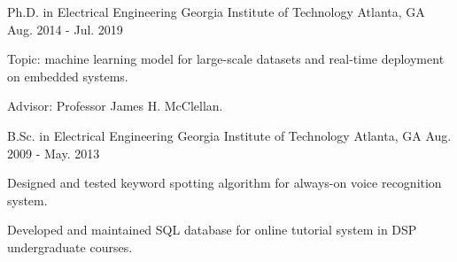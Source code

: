 

\begin{cventries}

	\cventry
		{Ph.D. in Electrical Engineering} %
		{Georgia Institute of Technology} %
		{Atlanta, GA} %
		{Aug. 2014 - Jul. 2019} %
		{
			\begin{cvitems} %
				\item {Topic: machine learning model for large-scale datasets and real-time 
				deployment on embedded systems.}
				\item {Advisor: Professor James H. McClellan.}
			\end{cvitems}
		}
		
	\cventry
		{B.Sc. in Electrical Engineering} %
		{Georgia Institute of Technology} %
		{Atlanta, GA} %
		{Aug. 2009 - May. 2013} %
		{
			\begin{cvitems} %
				\item {Designed and tested keyword spotting algorithm for always-on voice recognition system.}
				\item {Developed and maintained SQL database for online tutorial system in DSP 
				undergraduate courses.}
			\end{cvitems}
		}

\end{cventries}
